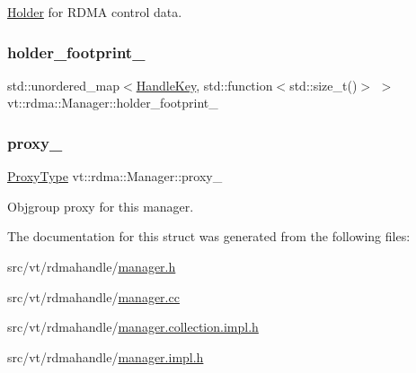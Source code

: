 \hyperlink{structvt_1_1rdma_1_1_holder}{Holder} for R\+D\+MA control data. 

\mbox{\label{structvt_1_1rdma_1_1_manager_a7f037c941c0c8fc3d5b29b3d235bf280}} 
\subsubsection{\texorpdfstring{holder\+\_\+footprint\+\_\+}{holder\_footprint\_}}
{\footnotesize\ttfamily std\+::unordered\+\_\+map$<$\hyperlink{structvt_1_1rdma_1_1_handle_key}{Handle\+Key}, std\+::function$<$std\+::size\+\_\+t()$>$ $>$ vt\+::rdma\+::\+Manager\+::holder\+\_\+footprint\+\_\+\hspace{0.3cm}{\ttfamily [private]}}

\mbox{\label{structvt_1_1rdma_1_1_manager_a033b59b7b1ecdf7e813d2999c03134cb}} 
\subsubsection{\texorpdfstring{proxy\+\_\+}{proxy\_}}
{\footnotesize\ttfamily \hyperlink{structvt_1_1rdma_1_1_manager_a75d5cdc6428ea19f5ec665b04dcd7166}{Proxy\+Type} vt\+::rdma\+::\+Manager\+::proxy\+\_\+\hspace{0.3cm}{\ttfamily [private]}}



Objgroup proxy for this manager. 



The documentation for this struct was generated from the following files\+:\begin{DoxyCompactItemize}
\item 
src/vt/rdmahandle/\hyperlink{rdmahandle_2manager_8h}{manager.\+h}\item 
src/vt/rdmahandle/\hyperlink{rdmahandle_2manager_8cc}{manager.\+cc}\item 
src/vt/rdmahandle/\hyperlink{manager_8collection_8impl_8h}{manager.\+collection.\+impl.\+h}\item 
src/vt/rdmahandle/\hyperlink{rdmahandle_2manager_8impl_8h}{manager.\+impl.\+h}\end{DoxyCompactItemize}
